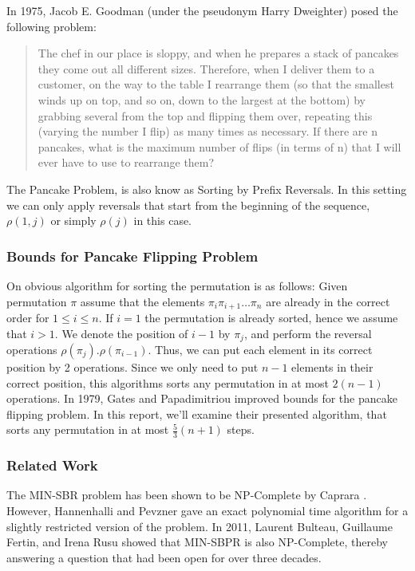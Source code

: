 In 1975, Jacob E. Goodman (under the pseudonym Harry Dweighter) posed the following problem:
\begin{quote}
The chef in our place is sloppy, and when he prepares a stack of pancakes they come out all different sizes. Therefore, when I deliver them to a customer, on the way to the table I rearrange them (so that the smallest winds up on top, and so on, down to the largest at the bottom) by grabbing several from the top and flipping them over, repeating this (varying the number I flip) as many times as necessary. If there are n pancakes, what is the maximum number of flips (in terms of n) that I will ever have to use to rearrange them?
\end{quote}
The Pancake Problem, is also know as Sorting by Prefix Reversals. In this setting we can only apply reversals that start from the beginning of the sequence, $ \rho (1, j) $ or simply $\rho(j)$ in this case. 

\subsubsection{Bounds for Pancake Flipping Problem}
On obvious algorithm for sorting the permutation is as follows:  Given permutation $ \pi $ assume that the elements $ \pi_i \pi_{i+1} \ldots \pi_{n} $ are already in the correct order for $ 1 \leq i \leq n $. If $ i = 1 $ the permutation is already sorted, hence we assume that $ i > 1$. We denote the position of $ i-1 $ by  $ \pi_{j} $, and perform the reversal operations $ \rho(\pi_{j}).\rho(\pi_{i-1})$. 
Thus, we can put each element in its correct position by 2 operations. Since we only need to put $n - 1$ elements in their correct position, this algorithms sorts any permutation in at most $2(n-1)$ operations. In 1979, Gates and Papadimitriou \cite{bounds} improved bounds for the pancake flipping problem. In this report, we'll examine their presented algorithm, that sorts any permutation in at most $\frac{5}{3}(n+1)$ steps. 

\subsubsection{Related Work}
The MIN-SBR problem has been shown to be NP-Complete by Caprara \cite{caprara}. However, Hannenhalli and Pevzner \cite{cabbages_into_turnips} gave an exact polynomial time algorithm for a slightly restricted version of the problem. In 2011, Laurent Bulteau, Guillaume Fertin, and Irena Rusu \cite{pancake-flipping-is-hard} showed that MIN-SBPR is also NP-Complete, thereby answering a question that had been open for over three decades.
